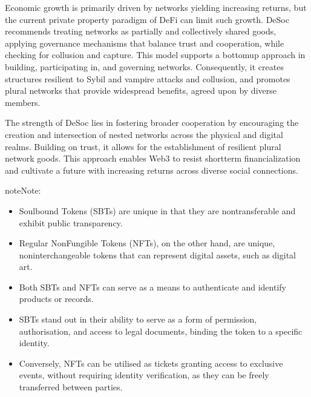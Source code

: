 \documentclass[letterpaper,10pt,english]{jupyterBook}
\begin{document}
\sphinxAtStartPar
Economic growth is primarily driven by networks yielding increasing returns, but the current private property paradigm of DeFi can limit such growth. DeSoc recommends treating networks as partially and collectively shared goods, applying governance mechanisms that balance trust and cooperation, while checking for collusion and capture. This model supports a bottom\sphinxhyphen{}up approach in building, participating in, and governing networks. Consequently, it creates structures resilient to Sybil and vampire attacks and collusion, and promotes plural networks that provide widespread benefits, agreed upon by diverse members.

\sphinxAtStartPar
The strength of DeSoc lies in fostering broader cooperation by encouraging the creation and intersection of nested networks across the physical and digital realms. Building on trust, it allows for the establishment of resilient plural network goods. This approach enables Web3 to resist short\sphinxhyphen{}term financialization and cultivate a future with increasing returns across diverse social connections.

\begin{sphinxadmonition}{note}{Note:}
\sphinxAtStartPar
{}
\begin{itemize}
\item {} 
\sphinxAtStartPar
Soulbound Tokens (SBTs) are unique in that they are non\sphinxhyphen{}transferable and exhibit public transparency.

\item {} 
\sphinxAtStartPar
Regular Non\sphinxhyphen{}Fungible Tokens (NFTs), on the other hand, are unique, non\sphinxhyphen{}interchangeable tokens that can represent digital assets, such as digital art.

\item {} 
\sphinxAtStartPar
Both SBTs and NFTs can serve as a means to authenticate and identify products or records.

\item {} 
\sphinxAtStartPar
SBTs stand out in their ability to serve as a form of permission, authorisation, and access to legal documents, binding the token to a specific identity.

\item {} 
\sphinxAtStartPar
Conversely, NFTs can be utilised as tickets granting access to exclusive events, without requiring identity verification, as they can be freely transferred between parties.

\end{itemize}
\end{sphinxadmonition}
\end{document}
